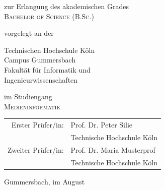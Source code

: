 \begin{titlepage}
\begin{center}
\vspace{1.2cm}

\begin{large}
zur Erlangung des akademischen Grades\\
\vspace{0.1cm}
\textsc{Bachelor of Science (B.Sc.)}\\ 
\end{large}

\vspace{0.6cm}

\begin{large}
vorgelegt an der\\ 
\vspace{0.2cm}
\begin{scshape}
Technischen Hochschule Köln\\
Campus Gummersbach\\
Fakultät für Informatik und\\
Ingenieurwissenschaften\\
\end{scshape}
\end{large}

\vspace{0.6cm}

\begin{large}
im Studiengang\\ 
\vspace{0.1cm}
\textsc{Medieninformatik}
\end{large}


\vspace{1.2cm}

\begin{tabular}{rl}
        Erster Prüfer/in:  &  Prof. Dr. Peter Silie\\
       					&  \small Technische Hochschule Köln \\[1.0em]
       Zweiter Prüfer/in:  &  Prof. Dr. Maria Musterprof\\
       					&  \small Technische Hochschule Köln\\
\end{tabular}

\vspace{1.2cm}

\begin{large}
Gummersbach, im August \the\year
\end{large}


\end{center}
\end{titlepage}
